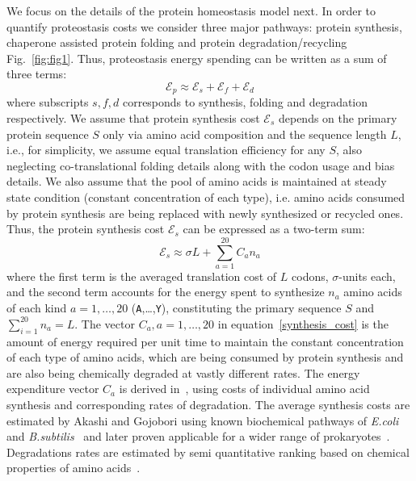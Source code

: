 \documentclass[10pt,letterpaper]{article}
\begin{document}
We focus on the details of the protein homeostasis model next. In order to quantify proteostasis costs we consider three major pathways: protein synthesis, chaperone assisted protein folding and protein degradation/recycling Fig.~\ref{fig:fig1}. Thus, proteostasis energy spending can be written as a sum of three terms:
\begin{equation}
	\label{proteostasis_cost_expansion}
	\mathcal{E}_{p} \approx \mathcal{E}_{s} + \mathcal{E}_{f} + \mathcal{E}_{d}
\end{equation}
where subscripts $s,f,d$ corresponds to synthesis, folding and degradation respectively. We assume that protein synthesis cost $\mathcal{E}_{s}$ depends on the primary protein sequence $S$ only via amino acid composition and the sequence length $L$, i.e., for simplicity, we assume equal translation efficiency for any $S$, also neglecting co-translational folding details along with the codon usage and bias details. We also assume that the pool of amino acids is maintained at steady state condition (constant concentration of each type), i.e. amino acids consumed by protein synthesis are being replaced with newly synthesized or recycled ones. Thus, the protein synthesis cost $\mathcal{E}_{s}$ can be expressed as a two-term sum:
\begin{equation}
	\label{synthesis_cost}
	\mathcal{E}_{s} \approx \sigma L + \sum\limits_{a=1}^{20}C_{a}n_{a}
\end{equation}
where the first term is the averaged translation cost of $L$ codons, $\sigma$-units each, and the second term accounts for the energy spent to synthesize $n_{a}$ amino acids of each kind $a=1,\dots,20$ (\texttt{A},\dots,\texttt{Y}), constituting the primary sequence $S$ and $\sum\limits_{i=1}^{20}n_{a} = L$. The vector $C_{a}, a=1,\dots,20$ in equation~\eqref{synthesis_cost} is the amount of energy required per unit time to maintain the constant concentration of each type of amino acids, which are being consumed by protein synthesis and are also being chemically degraded at vastly different rates. The energy expenditure vector $C_{a}$ is derived in~\cite{Krick2014Amino}, using costs of individual amino acid synthesis and corresponding rates of degradation. The average synthesis costs are estimated by Akashi and Gojobori using known biochemical pathways of {\it E.coli} and {\it B.subtilis}~\cite{Akashi2002Metabolic} and later proven applicable for a wider range of prokaryotes~\cite{Swire2007Selection,Heizer2006Amino}. Degradations rates are estimated by semi quantitative ranking based on chemical properties of amino acids~\cite{Krick2014Amino}.
\end{document}

